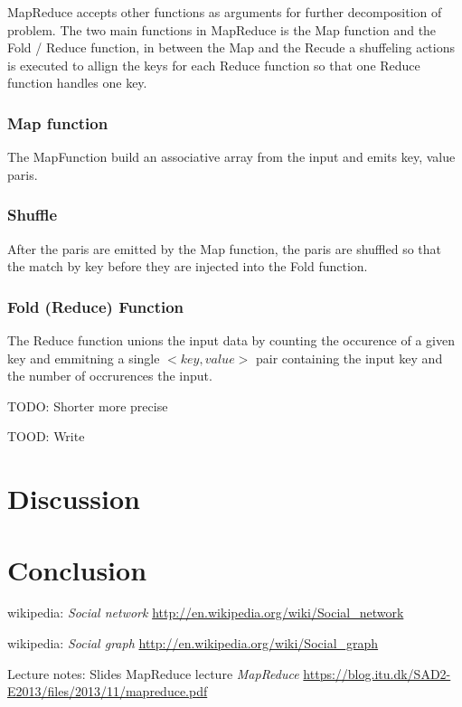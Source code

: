 \documentclass{article}
\begin{document}
\noindent MapReduce accepts other functions as arguments for further decomposition of problem. The two main functions in MapReduce is the Map function and the Fold / Reduce function, in between the Map and the Recude a shuffeling actions is executed to allign the keys for each Reduce function so that one Reduce function handles one key.



\subsubsection{Map function}
The MapFunction build an associative array from the input and emits key, value paris.



\subsubsection{Shuffle}
After the paris are emitted by the Map function, the paris are shuffled so that the match by key before they are injected into the Fold function.


\subsubsection{Fold (Reduce) Function}
The Reduce function unions the input data by counting the occurence of a given key and emmitning a single $<key,value>$ pair containing the input key and the number of occrurences the input.




TODO: Shorter more precise


TOOD: Write


\section{Discussion}

\section{Conclusion}

\begin{thebibliography}{1}

    wikipedia:
    \emph{Social network}
    \url{http://en.wikipedia.org/wiki/Social_network}

    wikipedia:
    \emph{Social graph}
    \url{http://en.wikipedia.org/wiki/Social_graph}

    Lecture notes: Slides MapReduce lecture
    \emph{MapReduce}
    \url{https://blog.itu.dk/SAD2-E2013/files/2013/11/mapreduce.pdf}
    
\end{thebibliography}
\end{document}
